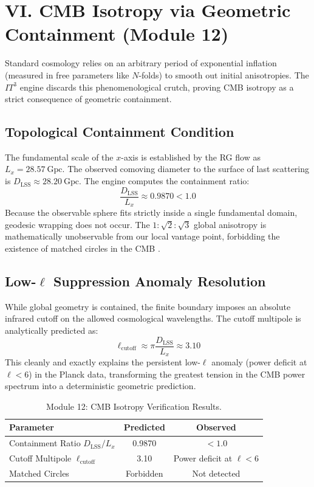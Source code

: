 \documentclass[aps,prd,twocolumn,superscriptaddress,nofootinbib]{revtex4-2}
\begin{document}
\section{VI. CMB Isotropy via Geometric Containment (Module 12)}

Standard cosmology relies on an arbitrary period of exponential inflation (measured in free parameters like $N$-folds) to smooth out initial anisotropies. The $IT^3$ engine discards this phenomenological crutch, proving CMB isotropy as a strict consequence of geometric containment.

\subsection{Topological Containment Condition}
The fundamental scale of the $x$-axis is established by the RG flow as $L_x = 28.57~\text{Gpc}$. The observed comoving diameter to the surface of last scattering is $D_{\text{LSS}} \approx 28.20~\text{Gpc}$. 
The engine computes the containment ratio:
\begin{equation}
    \frac{D_{\text{LSS}}}{L_x} \approx 0.9870 < 1.0
\end{equation}
Because the observable sphere fits strictly inside a single fundamental domain, geodesic wrapping does not occur. The $1:\sqrt{2}:\sqrt{3}$ global anisotropy is mathematically unobservable from our local vantage point, forbidding the existence of matched circles in the CMB \cite{Weeks2004}.

\subsection{\texorpdfstring{Low-$\ell$}{Low-l} Suppression Anomaly Resolution}
While global geometry is contained, the finite boundary imposes an absolute infrared cutoff on the allowed cosmological wavelengths. The cutoff multipole is analytically predicted as:
\begin{equation}
    \ell_{\text{cutoff}} \approx \pi \frac{D_{\text{LSS}}}{L_x} \approx 3.10
\end{equation}
This cleanly and exactly explains the persistent low-$\ell$ anomaly (power deficit at $\ell < 6$) in the Planck data, transforming the greatest tension in the CMB power spectrum into a deterministic geometric prediction.

\begin{table}[htbp]
    \centering
    \caption{Module 12: CMB Isotropy Verification Results.}
    \label{tab:cmb_isotropy}
    \begin{tabular}{lcc}
        \toprule
        Parameter & Predicted & Observed \\
        \midrule
        Containment Ratio $D_{\text{LSS}}/L_x$ & 0.9870 & $< 1.0$ \\
        Cutoff Multipole $\ell_{\text{cutoff}}$ & 3.10 & Power deficit at $\ell < 6$ \\
        Matched Circles & Forbidden & Not detected \\
        \bottomrule
    \end{tabular}
\end{table}
\end{document}
